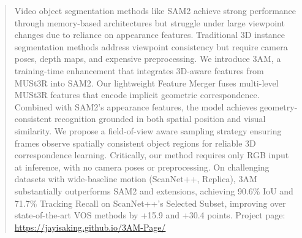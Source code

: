\begin{abstract}
Video object segmentation methods like SAM2 achieve strong performance through memory-based architectures but struggle under large viewpoint changes due to reliance on appearance features. Traditional 3D instance segmentation methods address viewpoint consistency but require camera poses, depth maps, and expensive preprocessing. We introduce 3AM, a training-time enhancement that integrates 3D-aware features from MUSt3R into SAM2. Our lightweight Feature Merger fuses multi-level MUSt3R features that encode implicit geometric correspondence. Combined with SAM2’s appearance features, the model achieves geometry-consistent recognition grounded in both spatial position and visual similarity. We propose a field-of-view aware sampling strategy ensuring frames observe spatially consistent object regions for reliable 3D correspondence learning. Critically, our method requires only RGB input at inference, with no camera poses or preprocessing. On challenging datasets with wide-baseline motion (ScanNet++, Replica), 3AM substantially outperforms SAM2 and extensions, achieving 90.6\% IoU and 71.7\% Tracking Recall on ScanNet++'s Selected Subset, improving over state-of-the-art VOS methods by +15.9 and +30.4 points.
Project page: \url{https://jayisaking.github.io/3AM-Page/}
\end{abstract}
